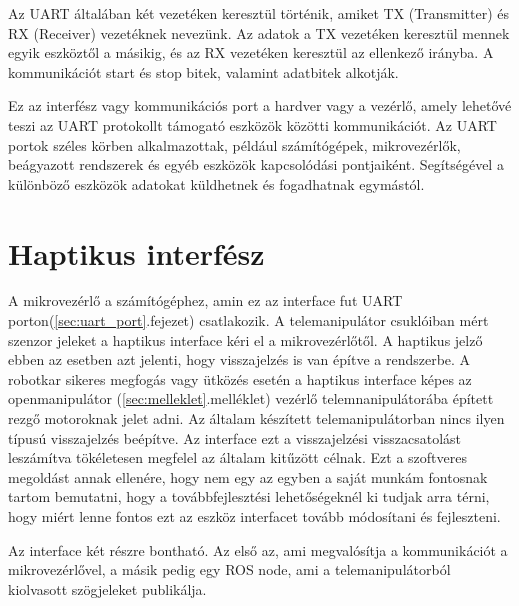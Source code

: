 Az UART általában két vezetéken keresztül történik, amiket TX (Transmitter) és RX (Receiver) vezetéknek nevezünk. Az adatok a TX vezetéken keresztül mennek egyik eszköztől a másikig, és az RX vezetéken keresztül az ellenkező irányba. A kommunikációt start és stop bitek, valamint adatbitek alkotják.

Ez az interfész  vagy kommunikációs port a hardver vagy a vezérlő, amely lehetővé teszi az UART protokollt támogató eszközök közötti kommunikációt. Az UART portok széles körben alkalmazottak, például számítógépek, mikrovezérlők, beágyazott rendszerek és egyéb eszközök kapcsolódási pontjaiként. Segítségével a különböző eszközök adatokat küldhetnek és fogadhatnak egymástól.

\section{Haptikus interfész}

A mikrovezérlő a számítógéphez, amin ez az interface fut UART porton(\ref{sec:uart_port}.fejezet) csatlakozik. A telemanipulátor csuklóiban mért szenzor jeleket a haptikus interface kéri el a mikrovezérlőtől. A haptikus jelző ebben az esetben azt jelenti, hogy visszajelzés is van építve a rendszerbe. A robotkar sikeres megfogás vagy ütközés esetén a haptikus interface képes az openmanipulátor (\ref{sec:melleklet}.melléklet) vezérlő telemnanipulátorába épített rezgő motoroknak jelet adni. Az általam készített telemanipulátorban nincs ilyen típusú visszajelzés beépítve. Az interface ezt a visszajelzési visszacsatolást leszámítva tökéletesen megfelel az általam kitűzött célnak. Ezt a szoftveres megoldást annak ellenére, hogy nem egy az egyben a saját munkám fontosnak tartom bemutatni, hogy a továbbfejlesztési lehetőségeknél ki tudjak arra térni, hogy miért lenne fontos ezt az eszköz interfacet tovább módosítani és fejleszteni.

Az interface két részre bontható. Az első az, ami megvalósítja a kommunikációt a mikrovezérlővel, a másik pedig egy ROS node, ami a telemanipulátorból kiolvasott szögjeleket publikálja.

